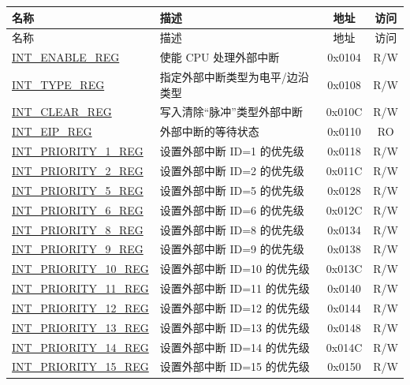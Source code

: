 
\begin{longtable}{ | p{4.0cm} | p{8.4cm} | c | c| }
\hline\rowcolor{lightgray}
名称 & 描述 & 地址 & 访问 \\ \hline
\endfirsthead
\hline
\rowcolor{lightgray}
名称 & 描述 & 地址 & 访问  \\
\hline
\endhead
\endfoot

\hyperref[regdesc:INTENABLEREG] {INT\_ENABLE\_REG} & 使能 CPU 处理外部中断 & 0x0104 & R/W \\\hline
\hyperref[regdesc:INTTYPEREG]{INT\_TYPE\_REG} & 指定外部中断类型为电平/边沿类型 & 0x0108 & R/W \\\hline
\hyperref[regdesc:INTCLEARREG] {INT\_CLEAR\_REG} & 写入清除“脉冲”类型外部中断 & 0x010C & R/W \\\hline
\hyperref[regdesc:INTEIPREG]{INT\_EIP\_REG} & 外部中断的等待状态 & 0x0110 & RO \\\hline
\hyperref[regdesc:INTPRIORITYREG]{INT\_PRIORITY\_1\_REG} & 设置外部中断 ID=1 的优先级 & 0x0118 & R/W \\\hline
\hyperref[regdesc:INTPRIORITYREG]{INT\_PRIORITY\_2\_REG} & 设置外部中断 ID=2 的优先级 & 0x011C & R/W \\\hline
\hyperref[regdesc:INTPRIORITYREG]{INT\_PRIORITY\_5\_REG} & 设置外部中断 ID=5 的优先级 & 0x0128 & R/W \\\hline
\hyperref[regdesc:INTPRIORITYREG]{INT\_PRIORITY\_6\_REG} & 设置外部中断 ID=6 的优先级 & 0x012C & R/W \\\hline
\hyperref[regdesc:INTPRIORITYREG]{INT\_PRIORITY\_8\_REG} & 设置外部中断 ID=8 的优先级 & 0x0134 & R/W \\\hline
\hyperref[regdesc:INTPRIORITYREG]{INT\_PRIORITY\_9\_REG} & 设置外部中断 ID=9 的优先级 & 0x0138 & R/W \\\hline
\hyperref[regdesc:INTPRIORITYREG]{INT\_PRIORITY\_10\_REG} & 设置外部中断 ID=10 的优先级 & 0x013C & R/W \\\hline
\hyperref[regdesc:INTPRIORITYREG]{INT\_PRIORITY\_11\_REG} & 设置外部中断 ID=11 的优先级 & 0x0140 & R/W \\\hline
\hyperref[regdesc:INTPRIORITYREG]{INT\_PRIORITY\_12\_REG} & 设置外部中断 ID=12 的优先级 & 0x0144 & R/W \\\hline
\hyperref[regdesc:INTPRIORITYREG]{INT\_PRIORITY\_13\_REG} & 设置外部中断 ID=13 的优先级 & 0x0148 & R/W \\\hline
\hyperref[regdesc:INTPRIORITYREG]{INT\_PRIORITY\_14\_REG} & 设置外部中断 ID=14 的优先级 & 0x014C & R/W \\\hline
\hyperref[regdesc:INTPRIORITYREG]{INT\_PRIORITY\_15\_REG} & 设置外部中断 ID=15 的优先级 & 0x0150 & R/W \\\hline

\end{longtable}
